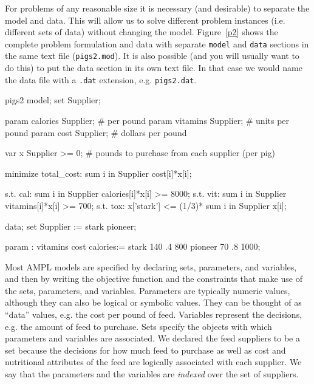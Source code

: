For problems of any reasonable size it is necessary (and desirable) to separate
the model and data. This will allow us to solve different problem instances
(i.e. different sets of data) without changing the model. Figure~\ref{p2} shows
the complete problem formulation and data with separate \texttt{model} and
\texttt{data} sections in the same text file (\texttt{pigs2.mod}). It is also
possible (and you will usually want to do this) to put the data section
in its own text file. In that case we would name the data file with a
\texttt{.dat} extension, e.g. \texttt{pigs2.dat}.

\begin{SaveVerbatim}{pigs2}
model;
set Supplier;

param calories {Supplier};  # per pound
param vitamins {Supplier};  # units per pound
param cost {Supplier};      # dollars per pound

var x {Supplier} >= 0;  # pounds to purchase from each supplier (per pig)

minimize total_cost: sum {i in Supplier} cost[i]*x[i];

s.t. cal: sum {i in Supplier} calories[i]*x[i] >= 8000;
s.t. vit: sum {i in Supplier} vitamins[i]*x[i] >= 700;
s.t. tox: x['stark'] <= (1/3)* sum {i in Supplier} x[i];

data;
set Supplier := stark pioneer;

param : vitamins cost calories:=
stark   140      .4    800
pioneer  70      .8   1000;
\end{SaveVerbatim}

\begin{figure}
\end{figure}

Most AMPL models are specified by declaring sets, parameters, and
variables, and then by writing the objective function and the
constraints that make use of the sets, parameters, and
variables. Parameters are typically numeric values, although they can
also be logical or symbolic values. They can be thought of as ``data''
values, e.g. the cost per pound of feed. Variables represent the
decisions, e.g. the amount of feed to purchase. Sets specify the
objects with which parameters and variables are associated. We
declared the feed suppliers to be a set because the decisions for how
much feed to purchase as well as cost and nutritional attributes of
the feed are logically associated with each supplier. We say that the
parameters and the variables are \emph{indexed} over the set of
suppliers.

